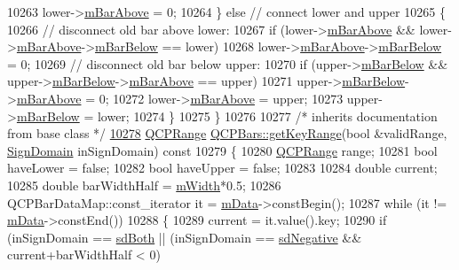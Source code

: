 \begin{DoxyCode}
10263     lower->\hyperlink{a00027_ade19776a2a6d393f15c0e27d4bb8e594}{mBarAbove} = 0;
10264   \} \textcolor{keywordflow}{else} \textcolor{comment}{// connect lower and upper}
10265   \{
10266     \textcolor{comment}{// disconnect old bar above lower:}
10267     \textcolor{keywordflow}{if} (lower->\hyperlink{a00027_ade19776a2a6d393f15c0e27d4bb8e594}{mBarAbove} && lower->\hyperlink{a00027_ade19776a2a6d393f15c0e27d4bb8e594}{mBarAbove}->\hyperlink{a00027_a02eb7de7a2c03dc5699f329bb1c5f6e1}{mBarBelow} == lower)
10268       lower->\hyperlink{a00027_ade19776a2a6d393f15c0e27d4bb8e594}{mBarAbove}->\hyperlink{a00027_a02eb7de7a2c03dc5699f329bb1c5f6e1}{mBarBelow} = 0;
10269     \textcolor{comment}{// disconnect old bar below upper:}
10270     \textcolor{keywordflow}{if} (upper->\hyperlink{a00027_a02eb7de7a2c03dc5699f329bb1c5f6e1}{mBarBelow} && upper->\hyperlink{a00027_a02eb7de7a2c03dc5699f329bb1c5f6e1}{mBarBelow}->\hyperlink{a00027_ade19776a2a6d393f15c0e27d4bb8e594}{mBarAbove} == upper)
10271       upper->\hyperlink{a00027_a02eb7de7a2c03dc5699f329bb1c5f6e1}{mBarBelow}->\hyperlink{a00027_ade19776a2a6d393f15c0e27d4bb8e594}{mBarAbove} = 0;
10272     lower->\hyperlink{a00027_ade19776a2a6d393f15c0e27d4bb8e594}{mBarAbove} = upper;
10273     upper->\hyperlink{a00027_a02eb7de7a2c03dc5699f329bb1c5f6e1}{mBarBelow} = lower;
10274   \}
10275 \}
10276 
10277 \textcolor{comment}{/* inherits documentation from base class */}
\hypertarget{a00115_source_l10278}{}\hyperlink{a00027_adbf608df1ba1d28c0bc7a929b18d997b}{10278} \hyperlink{a00049}{QCPRange} \hyperlink{a00027_adbf608df1ba1d28c0bc7a929b18d997b}{QCPBars::getKeyRange}(\textcolor{keywordtype}{bool} &validRange, 
      \hyperlink{a00024_a661743478a1d3c09d28ec2711d7653d8}{SignDomain} inSignDomain)\textcolor{keyword}{ const}
10279 \textcolor{keyword}{}\{
10280   \hyperlink{a00049}{QCPRange} range;
10281   \textcolor{keywordtype}{bool} haveLower = \textcolor{keyword}{false};
10282   \textcolor{keywordtype}{bool} haveUpper = \textcolor{keyword}{false};
10283   
10284   \textcolor{keywordtype}{double} current;
10285   \textcolor{keywordtype}{double} barWidthHalf = \hyperlink{a00027_a7c4e0f2246f8133f48a9c3f24cf5b920}{mWidth}*0.5;
10286   QCPBarDataMap::const\_iterator it = \hyperlink{a00027_aef28d29d51ef84b608ecd22c55d531ff}{mData}->constBegin();
10287   \textcolor{keywordflow}{while} (it != \hyperlink{a00027_aef28d29d51ef84b608ecd22c55d531ff}{mData}->constEnd())
10288   \{
10289     current = it.value().key;
10290     \textcolor{keywordflow}{if} (inSignDomain == \hyperlink{a00024_a661743478a1d3c09d28ec2711d7653d8a082b98cfb91a7363a3b5cd17b0c1cd60}{sdBoth} || (inSignDomain == \hyperlink{a00024_a661743478a1d3c09d28ec2711d7653d8a0fc9a70796ef60ad18ddd18056e6dc63}{sdNegative} && current+barWidthHalf < 0) 

\end{DoxyCode}
